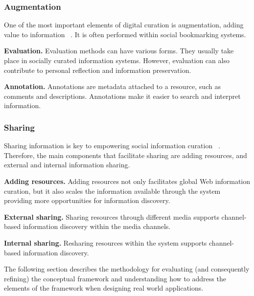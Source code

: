 \documentclass{casconpaper}
\begin{document}
{\subsubsection{Augmentation}
One of the most important elements of digital curation is augmentation, adding value to information ~\cite{beagrie, wittaker}. It is often performed within social bookmarking systems.

\textbf{Evaluation.} Evaluation methods can have various forms. They usually take place in socially curated information systems. However, evaluation can also contribute to personal reflection and information preservation. 

\textbf{Annotation.} Annotations are metadata attached to a resource, such as comments and descriptions. Annotations make it easier to search and interpret information. 
} %

{\subsubsection{Sharing}
Sharing information is key to empowering social information curation ~\cite{beagrie}. Therefore, the main components that facilitate sharing are adding resources, and external and internal information sharing.

\textbf{Adding resources.} Adding resources not only facilitates global Web information curation, but it also scales the information available through the system providing more opportunities for information discovery.

\textbf{External sharing.} Sharing resources through different media supports channel-based information discovery within the media channels. 

\textbf{Internal sharing.} Resharing resources within the system supports channel-based information discovery. 
 

} %

The following section describes the methodology for evaluating (and consequently refining) the conceptual framework and understanding how to address the elements of the framework when designing real world applications.
\end{document}
